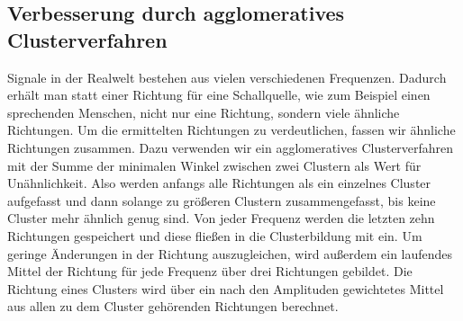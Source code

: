 \subsection{Verbesserung durch agglomeratives Clusterverfahren}
Signale in der Realwelt bestehen aus vielen verschiedenen Frequenzen. Dadurch erhält man statt einer Richtung für eine Schallquelle, wie zum Beispiel einen sprechenden Menschen, nicht nur eine Richtung, sondern viele ähnliche Richtungen. Um die ermittelten Richtungen zu verdeutlichen, fassen wir ähnliche Richtungen zusammen. Dazu verwenden wir ein agglomeratives Clusterverfahren mit der Summe der minimalen Winkel zwischen zwei Clustern als Wert für Unähnlichkeit. Also werden anfangs alle Richtungen als ein einzelnes Cluster aufgefasst und dann solange zu größeren Clustern zusammengefasst, bis keine Cluster mehr ähnlich genug sind. Von jeder Frequenz werden die letzten zehn Richtungen gespeichert und diese fließen in die Clusterbildung mit ein. Um geringe Änderungen in der Richtung auszugleichen, wird außerdem ein laufendes Mittel der Richtung für jede Frequenz über drei Richtungen gebildet. Die Richtung eines Clusters wird über ein nach den Amplituden gewichtetes Mittel aus allen zu dem Cluster gehörenden Richtungen berechnet.

